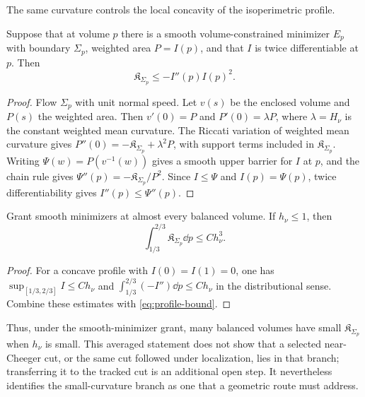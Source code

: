 \documentclass[../../main.tex]{subfiles}
\begin{document}
The same curvature controls the local concavity of the isoperimetric profile.

\begin{lemma}
\label{lem:profile-bound}
Suppose that at volume $p$ there is a smooth volume-constrained minimizer $E_p$ with boundary
$\Sigma_p$, weighted area $P=I(p)$, and that $I$ is twice differentiable at $p$. Then
\begin{equation}\label{eq:profile-bound}
  \mathfrak K_{\Sigma_p}\le -I''(p)I(p)^2 .
\end{equation}
\end{lemma}

\begin{proof}
Flow $\Sigma_p$ with unit normal speed. Let $v(s)$ be the enclosed volume and $P(s)$ the weighted
area. Then $v'(0)=P$ and $P'(0)=\lambda P$, where $\lambda=H_\nu$ is the constant weighted mean
curvature. The Riccati variation of weighted mean curvature gives
$P''(0)=-\mathfrak K_{\Sigma_p}+\lambda^2P$, with support terms included in
$\mathfrak K_{\Sigma_p}$. Writing $\Psi(w)=P(v^{-1}(w))$ gives a smooth upper barrier for $I$ at
$p$, and the chain rule gives $\Psi''(p)=-\mathfrak K_{\Sigma_p}/P^2$. Since $I\le\Psi$ and
$I(p)=\Psi(p)$, twice differentiability gives $I''(p)\le\Psi''(p)$.
\end{proof}

\begin{corollary}
\label{cor:generic-degeneracy}
Grant smooth minimizers at almost every balanced volume. If $h_\nu\le1$, then
\begin{equation}\label{eq:K-average}
  \int_{1/3}^{2/3}\mathfrak K_{\Sigma_p}\dd p\le C h_\nu^3 .
\end{equation}
\end{corollary}

\begin{proof}
For a concave profile with $I(0)=I(1)=0$, one has
$\sup_{[1/3,2/3]}I\le C h_\nu$ and
$\int_{1/3}^{2/3}(-I'')\dd p\le C h_\nu$ in the distributional sense. Combine these estimates with
\eqref{eq:profile-bound}.
\end{proof}

Thus, under the smooth-minimizer grant, many balanced volumes have small
$\mathfrak K_{\Sigma_p}$ when $h_\nu$ is small. This averaged statement does not show that a
selected near-Cheeger cut, or the same cut followed under localization, lies in that branch;
transferring it to the tracked cut is an additional open step. It nevertheless identifies the
small-curvature branch as one that a geometric route must address.
\end{document}
